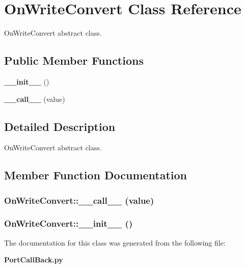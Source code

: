 \section{On\-Write\-Convert Class Reference}
\label{classOnWriteConvert}
On\-Write\-Convert abstract class.  


\subsection*{Public Member Functions}
\begin{CompactItemize}
\item 
{\bf \_\-\_\-init\_\-\_\-} ()
\item 
{\bf \_\-\_\-call\_\-\_\-} (value)
\end{CompactItemize}


\subsection{Detailed Description}
On\-Write\-Convert abstract class. 



\subsection{Member Function Documentation}
\subsubsection{\setlength{\rightskip}{0pt plus 5cm}On\-Write\-Convert::\_\-\_\-call\_\-\_\- (value)}\label{classOnWriteConvert_OnWriteConverta1}


\subsubsection{\setlength{\rightskip}{0pt plus 5cm}On\-Write\-Convert::\_\-\_\-init\_\-\_\- ()}\label{classOnWriteConvert_OnWriteConverta0}




The documentation for this class was generated from the following file:\begin{CompactItemize}
\item 
{\bf Port\-Call\-Back.py}\end{CompactItemize}
